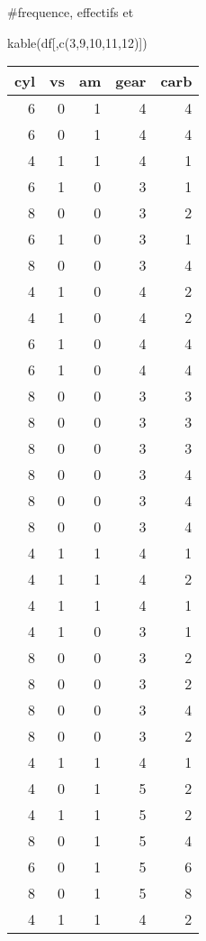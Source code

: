 \documentclass[
]{article}
\newenvironment{Shaded}{\begin{snugshade}}{\end{snugshade}}
\newcommand{\DecValTok}[1]{\textcolor[rgb]{0.00,0.00,0.81}{#1}}
\newcommand{\FunctionTok}[1]{\textcolor[rgb]{0.00,0.00,0.00}{#1}}
\newcommand{\NormalTok}[1]{#1}
\begin{document}
\#frequence, effectifs et

\begin{Shaded}
\begin{Highlighting}[]
\FunctionTok{kable}\NormalTok{(df[,}\FunctionTok{c}\NormalTok{(}\DecValTok{3}\NormalTok{,}\DecValTok{9}\NormalTok{,}\DecValTok{10}\NormalTok{,}\DecValTok{11}\NormalTok{,}\DecValTok{12}\NormalTok{)])}
\end{Highlighting}
\end{Shaded}

\begin{longtable}[]{@{}rrrrr@{}}
\toprule
cyl & vs & am & gear & carb \\
\midrule
\endhead
6 & 0 & 1 & 4 & 4 \\
6 & 0 & 1 & 4 & 4 \\
4 & 1 & 1 & 4 & 1 \\
6 & 1 & 0 & 3 & 1 \\
8 & 0 & 0 & 3 & 2 \\
6 & 1 & 0 & 3 & 1 \\
8 & 0 & 0 & 3 & 4 \\
4 & 1 & 0 & 4 & 2 \\
4 & 1 & 0 & 4 & 2 \\
6 & 1 & 0 & 4 & 4 \\
6 & 1 & 0 & 4 & 4 \\
8 & 0 & 0 & 3 & 3 \\
8 & 0 & 0 & 3 & 3 \\
8 & 0 & 0 & 3 & 3 \\
8 & 0 & 0 & 3 & 4 \\
8 & 0 & 0 & 3 & 4 \\
8 & 0 & 0 & 3 & 4 \\
4 & 1 & 1 & 4 & 1 \\
4 & 1 & 1 & 4 & 2 \\
4 & 1 & 1 & 4 & 1 \\
4 & 1 & 0 & 3 & 1 \\
8 & 0 & 0 & 3 & 2 \\
8 & 0 & 0 & 3 & 2 \\
8 & 0 & 0 & 3 & 4 \\
8 & 0 & 0 & 3 & 2 \\
4 & 1 & 1 & 4 & 1 \\
4 & 0 & 1 & 5 & 2 \\
4 & 1 & 1 & 5 & 2 \\
8 & 0 & 1 & 5 & 4 \\
6 & 0 & 1 & 5 & 6 \\
8 & 0 & 1 & 5 & 8 \\
4 & 1 & 1 & 4 & 2 \\
\bottomrule
\end{longtable}
\end{document}
